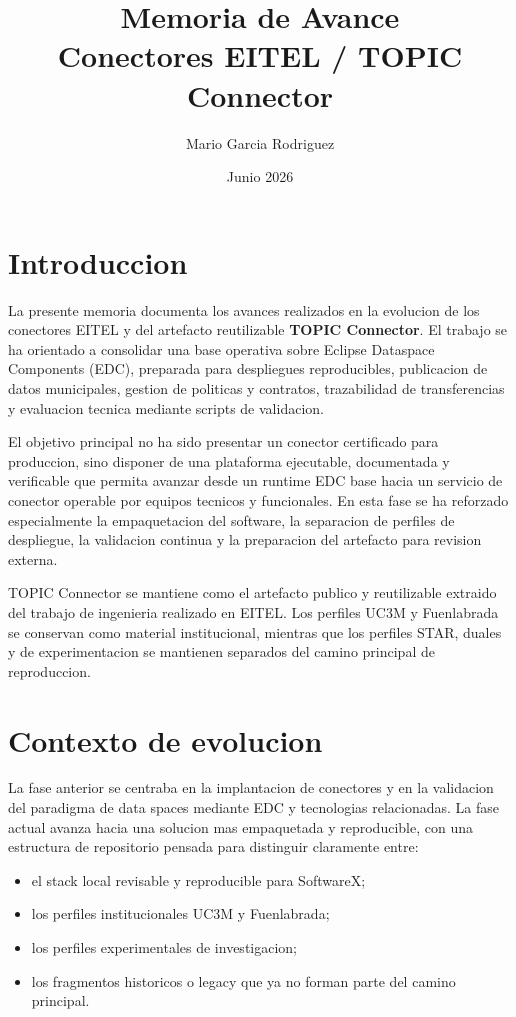 \documentclass{article}
\title{Memoria de Avance\\Conectores EITEL / TOPIC Connector}
\author{Mario Garcia Rodriguez}
\date{Junio 2026}
\begin{document}
\maketitle

\section{Introduccion}

La presente memoria documenta los avances realizados en la evolucion de los conectores EITEL y del artefacto reutilizable \textbf{TOPIC Connector}. El trabajo se ha orientado a consolidar una base operativa sobre Eclipse Dataspace Components (EDC), preparada para despliegues reproducibles, publicacion de datos municipales, gestion de politicas y contratos, trazabilidad de transferencias y evaluacion tecnica mediante scripts de validacion.

El objetivo principal no ha sido presentar un conector certificado para produccion, sino disponer de una plataforma ejecutable, documentada y verificable que permita avanzar desde un runtime EDC base hacia un servicio de conector operable por equipos tecnicos y funcionales. En esta fase se ha reforzado especialmente la empaquetacion del software, la separacion de perfiles de despliegue, la validacion continua y la preparacion del artefacto para revision externa.

TOPIC Connector se mantiene como el artefacto publico y reutilizable extraido del trabajo de ingenieria realizado en EITEL. Los perfiles UC3M y Fuenlabrada se conservan como material institucional, mientras que los perfiles STAR, duales y de experimentacion se mantienen separados del camino principal de reproduccion.

\section{Contexto de evolucion}

La fase anterior se centraba en la implantacion de conectores y en la validacion del paradigma de data spaces mediante EDC y tecnologias relacionadas. La fase actual avanza hacia una solucion mas empaquetada y reproducible, con una estructura de repositorio pensada para distinguir claramente entre:

\begin{itemize}[leftmargin=1.2cm]
    \item el stack local revisable y reproducible para SoftwareX;
    \item los perfiles institucionales UC3M y Fuenlabrada;
    \item los perfiles experimentales de investigacion;
    \item los fragmentos historicos o legacy que ya no forman parte del camino principal.
\end{itemize}
\end{document}

